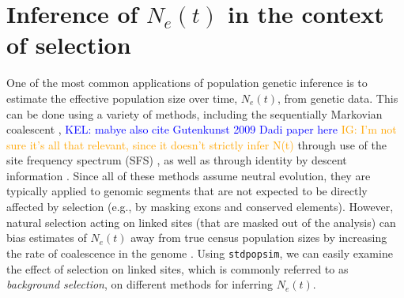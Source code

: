 \documentclass[hidelinks]{article}
\newcommand{\stdpopsim}{\texttt{stdpopsim}\xspace}
\newcommand{\kelcomment}[1]{\textcolor{blue}{KEL: #1}}
\newcommand{\igcomment}[1]{\textcolor{orange}{IG: #1}}
\begin{document}

    \section*{Inference of $N_e(t)$ in the context of selection}
    One of the most common applications of population genetic inference is to estimate
    the effective population size over time, $N_e(t)$, from genetic data. This can be done
    using a variety of methods, including the sequentially Markovian coalescent
    \citep{li2011inference,Schiffels2020,terhorst2017robust}, \kelcomment{mabye also cite Gutenkunst 2009 Dadi paper here} 
    \igcomment{I'm not sure it's all that relevant, since it doesn't strictly infer N(t)}
    through use of the site frequency spectrum (SFS) \citep{liu2020stairway},
    as well as through identity by descent information \citep{santiago2020recent}.
    Since all of these methods assume neutral evolution, they are typically applied to genomic
    segments that are not expected to be directly affected by selection (e.g., by masking exons
    and conserved elements).
    However, natural selection acting on linked sites (that are masked out of the analysis)
    can bias estimates of $N_e(t)$
    away from true census population sizes by increasing the 
    rate of coalescence in the genome \citep[e.g.][]{schrider2016effects}. 
    Using \stdpopsim, we can easily examine the effect of selection on linked sites,
    which is commonly referred to as \emph{background selection}, 
    on different methods for inferring $N_e(t)$.
\end{document}
